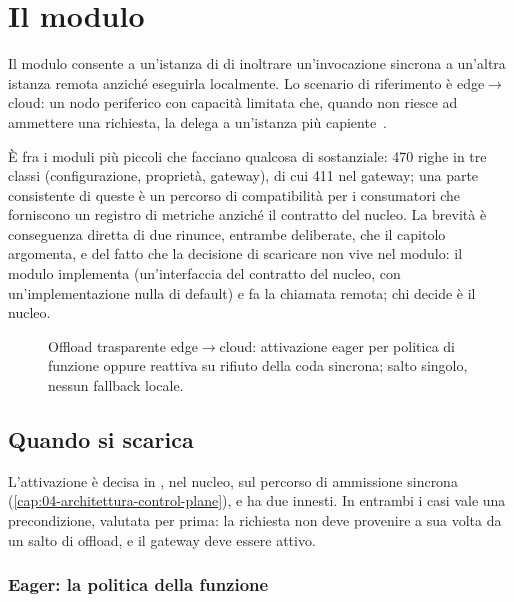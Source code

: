 \chapter{Il modulo }
\label{cap:13-offload}

Il modulo  consente a un'istanza di \nf{} di inoltrare
un'invocazione sincrona a un'altra istanza remota anzich\'e eseguirla localmente.
Lo scenario di riferimento \`e edge$\to$cloud: un nodo periferico con capacit\`a
limitata che, quando non riesce ad ammettere una richiesta, la delega a
un'istanza pi\`u capiente~\cite{satya2017edge, shi2016edge}.

\`E fra i moduli pi\`u piccoli che facciano qualcosa di sostanziale: 470 righe in
tre classi (configurazione, propriet\`a, gateway), di cui 411 nel gateway; una
parte consistente di queste \`e un percorso di compatibilit\`a per i consumatori
che forniscono un registro di metriche anzich\'e il contratto del nucleo. La
brevit\`a \`e conseguenza diretta di due rinunce, entrambe deliberate, che il
capitolo argomenta, e del fatto che la decisione di scaricare non vive nel
modulo: il modulo implementa  (un'interfaccia del contratto
del nucleo, con un'implementazione nulla di default) e fa la chiamata remota; chi
decide \`e il nucleo.

\begin{figure}[htbp]
  \centering
  \resizebox{0.95\textwidth}{!}{}
  \caption{Offload trasparente edge$\to$cloud: attivazione eager per politica di
  funzione oppure reattiva su rifiuto della coda sincrona; salto singolo, nessun
  fallback locale.}
  \label{fig:offload}
\end{figure}

\section{Quando si scarica}

L'attivazione \`e decisa in , nel nucleo, sul
percorso di ammissione sincrona (\cref{cap:04-architettura-control-plane}), e ha
due innesti. In entrambi i casi vale una precondizione, valutata per prima: la
richiesta non deve provenire a sua volta da un salto di offload, e il gateway deve
essere attivo.

\subsection{Eager: la politica della funzione}

